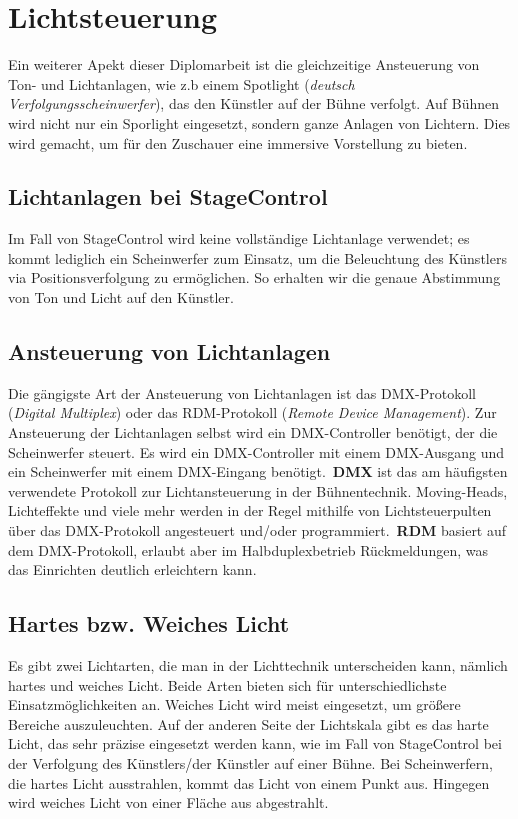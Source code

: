 \section{Lichtsteuerung}
Ein weiterer Apekt dieser Diplomarbeit ist die gleichzeitige Ansteuerung von Ton- und Lichtanlagen, wie z.b einem Spotlight (\emph{deutsch Verfolgungsscheinwerfer}), das den Künstler auf der Bühne verfolgt. Auf Bühnen wird nicht nur ein Sporlight eingesetzt, sondern ganze Anlagen von Lichtern. Dies wird gemacht, um für den Zuschauer eine immersive Vorstellung zu bieten. 

\subsection{Lichtanlagen bei StageControl}
Im Fall von StageControl wird keine vollständige Lichtanlage verwendet; es kommt lediglich ein Scheinwerfer zum Einsatz, um die Beleuchtung des Künstlers via Positionsverfolgung zu ermöglichen. So erhalten wir die genaue Abstimmung von Ton und Licht auf den Künstler.

\subsection{Ansteuerung von Lichtanlagen}
Die gängigste Art der Ansteuerung von Lichtanlagen ist das DMX-Protokoll (\emph{Digital Multiplex}) oder das RDM-Protokoll (\emph{Remote Device Management}). Zur Ansteuerung der Lichtanlagen selbst wird ein DMX-Controller benötigt, der die Scheinwerfer steuert. Es wird ein DMX-Controller mit einem DMX-Ausgang und ein Scheinwerfer mit einem DMX-Eingang benötigt.\
\textbf{DMX} ist das am häufigsten verwendete Protokoll zur Lichtansteuerung in der Bühnentechnik. Moving-Heads, Lichteffekte und viele mehr werden in der Regel mithilfe von Lichtsteuerpulten über das DMX-Protokoll angesteuert und/oder programmiert.\
\textbf{RDM} basiert auf dem DMX-Protokoll, erlaubt aber im Halbduplexbetrieb Rückmeldungen, was das Einrichten deutlich erleichtern kann.\\
\cite{Lichtanlage_RDM_DMX}

\subsection{Hartes bzw. Weiches Licht}
Es gibt zwei Lichtarten, die man in der Lichttechnik unterscheiden kann, nämlich hartes und weiches Licht. Beide Arten bieten sich für unterschiedlichste Einsatzmöglichkeiten an. Weiches Licht wird meist eingesetzt, um größere Bereiche auszuleuchten. Auf der anderen Seite der Lichtskala gibt es das harte Licht, das sehr präzise eingesetzt werden kann, wie im Fall von StageControl bei der Verfolgung des Künstlers/der Künstler auf einer Bühne. Bei Scheinwerfern, die hartes Licht ausstrahlen, kommt das Licht von einem Punkt aus. Hingegen wird weiches Licht von einer Fläche aus abgestrahlt.\\
\cite{Hartes_Weiches_Licht}

